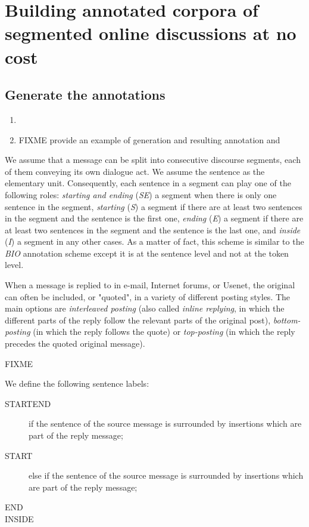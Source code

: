 
\section{Building annotated corpora of segmented online discussions at no cost}
\label{}

\subsection{Generate the annotations}
\label{}

\begin{enumerate}
\item 
\item FIXME provide an example of generation and resulting annotation and 
\end{enumerate}


We assume that a message can be split into %
 consecutive discourse segments, each of them conveying its own dialogue act.
We assume the sentence as the elementary unit.
Consequently, each sentence in a segment can play one of the following roles: 
\textit{starting and ending} (\textit{SE}) a segment when there is only one sentence in the segment, 
\textit{starting} (\textit{S}) a segment if there are at least two sentences in the segment and the sentence is the first one, 
\textit{ending} (\textit{E}) a segment if there are at least two sentences in the segment and the sentence is the last one, and \textit{inside} (\textit{I}) a segment in any other cases.
%
As a matter of fact, this scheme is similar to the \textit{BIO} annotation scheme except it is at the sentence level and not at the token level.



When a message is replied to in e-mail, Internet forums, or Usenet, the original can often be included, or "quoted", in a variety of different posting styles.
%
The main options are {\em interleaved posting} (also called {\em inline replying}, in which the different parts of the reply follow the relevant parts of the original post), \textit{bottom-posting} (in which the reply follows the quote) or \textit{top-posting} (in which the reply precedes the quoted original message). 


FIXME


We define the following sentence labels: 
\begin{description}
\item [STARTEND] if the sentence of the source message is surrounded by insertions which are part of the reply message;
\item [START] else if the sentence of the source message is surrounded by insertions which are part of the reply message;
\item [END]
\item [INSIDE]
\end{description}


